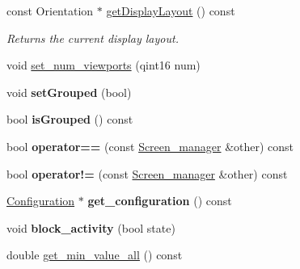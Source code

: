 \begin{DoxyCompactItemize}
\mbox{\label{classScreen__manager_a6c41fbe3b06a11879010f8cce4488953}} 
const Orientation $\ast$ \mbox{\hyperlink{classScreen__manager_a6c41fbe3b06a11879010f8cce4488953}{get\+Display\+Layout}} () const
\begin{DoxyCompactList}\small\item\em Returns the current display layout. \end{DoxyCompactList}\item 
\mbox{\label{classScreen__manager_a15f0b7a953e3a15c46ccff31681f2c8d}} 
void \mbox{\hyperlink{classScreen__manager_a15f0b7a953e3a15c46ccff31681f2c8d}{set\+\_\+num\+\_\+viewports}} (qint16 num)
\item 
\mbox{\label{classScreen__manager_ad86ad708eacc70d09ddfea3991c1436a}} 
void {\bfseries set\+Grouped} (bool)
\item 
\mbox{\label{classScreen__manager_a1e9502d390457183eb1924753c3ffbaa}} 
bool {\bfseries is\+Grouped} () const
\item 
\mbox{\label{classScreen__manager_a491fb46b4eb96fb363848a1c506528bd}} 
bool {\bfseries operator==} (const \mbox{\hyperlink{classScreen__manager}{Screen\+\_\+manager}} \&other) const
\item 
\mbox{\label{classScreen__manager_a5f6269a00491d2dd64f4da8506f37d2f}} 
bool {\bfseries operator!=} (const \mbox{\hyperlink{classScreen__manager}{Screen\+\_\+manager}} \&other) const
\item 
\mbox{\label{classScreen__manager_a78723343009e85b288d800d9cc19bf80}} 
\mbox{\hyperlink{classConfiguration}{Configuration}} $\ast$ {\bfseries get\+\_\+configuration} () const
\item 
\mbox{\label{classScreen__manager_aad35e109d8d77378eb94605d10426a6f}} 
void {\bfseries block\+\_\+activity} (bool state)
\item 
\mbox{\label{classScreen__manager_ac859de377f3ac1b7f18a9be9a21c193b}} 
double \mbox{\hyperlink{classScreen__manager_ac859de377f3ac1b7f18a9be9a21c193b}{get\+\_\+min\+\_\+value\+\_\+all}} () const

\end{DoxyCompactItemize}
